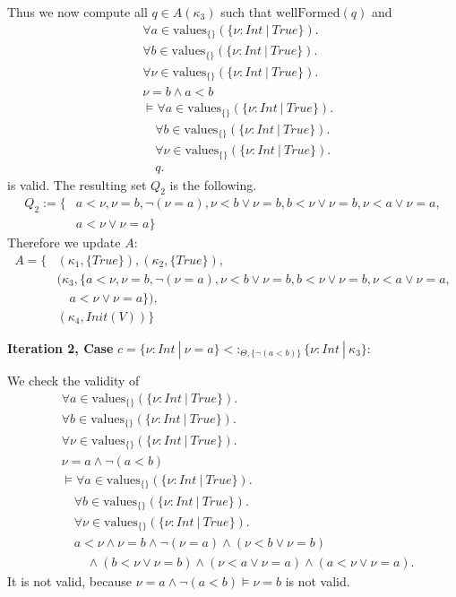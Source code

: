 \documentclass[]{scrbook}
\theoremstyle{definition}
\theoremstyle{definition}
\theoremstyle{definition}
\theoremstyle{remark}
\begin{document}
Thus we now compute all \(q\in A(\kappa_3)\) such that
\(\text{wellFormed}(q)\) and \[
\begin{aligned}
&\forall a\in\text{values}_{\{\}}(\{\nu:\mathit{Int}\ |\ \mathit{True}\}).\\
&\forall b\in\text{values}_{\{\}}(\{\nu:\mathit{Int}\ |\ \mathit{True}\}).\\
&\forall \nu\in\text{values}_{\{\}}(\{\nu:\mathit{Int}\ |\ \mathit{True}\}).\\
&\nu = b \land a < b\\
&\vDash\forall a\in\text{values}_{\{\}}(\{\nu:\mathit{Int}\ |\ \mathit{True}\}).\\
&\quad\forall b\in\text{values}_{\{\}}(\{\nu:\mathit{Int}\ |\ \mathit{True}\}).\\
&\quad\forall \nu\in\text{values}_{\{\}}(\{\nu:\mathit{Int}\ |\ \mathit{True}\}).\\
&\quad q.
\end{aligned}
\] is valid. The resulting set \(Q_2\) is the following. \[
\begin{aligned}
Q_2 := \{ &a < \nu, \nu = b, \neg (\nu = a),\nu < b \lor \nu = b, b < \nu \lor \nu = b,\nu < a \lor \nu = a,\\
&a < \nu \lor \nu = a\}
\end{aligned}
\] Therefore we update \(A\): \[
\begin{aligned}
A = \{ &(\kappa_1,\{\mathit{True}\}),(\kappa_2,\{\mathit{True}\}),\\
  &(\kappa_3,\{a < \nu, \nu = b, \neg (\nu = a),\nu < b \lor \nu = b, b < \nu \lor \nu = b,\nu < a \lor \nu = a,\\
  &\quad a < \nu \lor \nu = a\}),\\
  &(\kappa_4,\mathit{Init}(V))\}
\end{aligned}
\]

\textbf{Iteration 2, Case }
\(c = \{\nu:\mathit{Int}\ |\ \nu = a\}<:_{\Theta,\{\neg (a < b)\}}\{\nu:\mathit{Int}\ |\ \kappa_3\}\):

We check the validity of \[
\begin{aligned}
&\forall a\in\text{values}_{\{\}}(\{\nu:\mathit{Int}\ |\ \mathit{True}\}).\\
&\forall b\in\text{values}_{\{\}}(\{\nu:\mathit{Int}\ |\ \mathit{True}\}).\\
&\forall \nu\in\text{values}_{\{\}}(\{\nu:\mathit{Int}\ |\ \mathit{True}\}).\\
&\nu = a \land \neg (a < b)\\
&\vDash\forall a\in\text{values}_{\{\}}(\{\nu:\mathit{Int}\ |\ \mathit{True}\}).\\
&\quad\forall b\in\text{values}_{\{\}}(\{\nu:\mathit{Int}\ |\ \mathit{True}\}).\\
&\quad\forall \nu\in\text{values}_{\{\}}(\{\nu:\mathit{Int}\ |\ \mathit{True}\}).\\
&\quad a < \nu\land \nu = b\land \neg (\nu = a)\land (\nu < b \lor \nu = b)\\
&\quad\quad\land (b < \nu \lor \nu = b)\land(\nu < a \lor \nu = a)\land (a < \nu \lor \nu = a).
\end{aligned}
\] It is not valid, because \(\nu = a \land \neg (a < b) \vDash\nu = b\)
is not valid.
\end{document}
